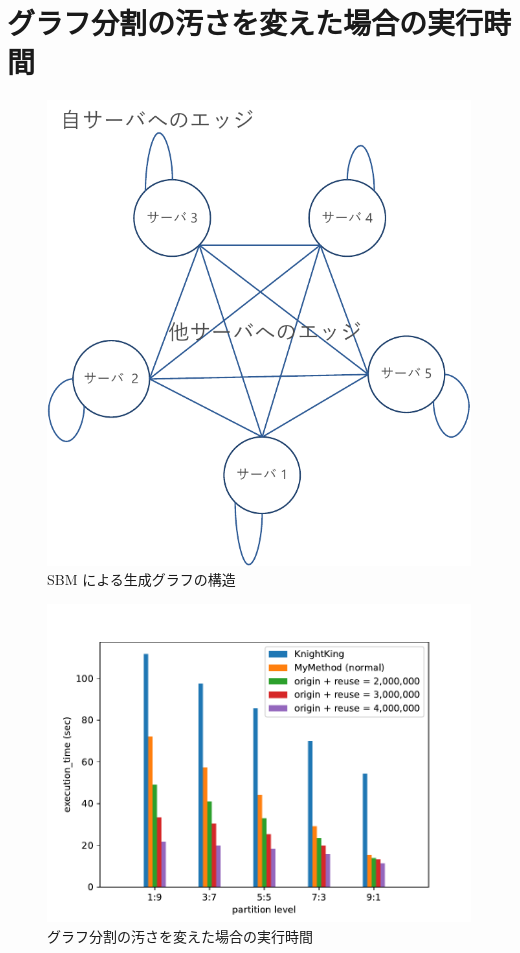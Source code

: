 \section{グラフ分割の汚さを変えた場合の実行時間}\label{グラフ分割の汚さを変えた場合の実行時間}

\begin{figure}[t]
    \centering
    \includegraphics[scale=0.7]{figure/sbm.pdf}
    \caption{SBM による生成グラフの構造}
    \label{SBM による生成グラフの構造}
\end{figure}

\begin{figure}[t!]
    \centering
    \includegraphics[scale=0.9]{figure/Kn_vs_AR_partition_level.pdf}
    \caption{グラフ分割の汚さを変えた場合の実行時間}
    \label{グラフ分割の汚さを変えた場合の実行時間の結果}
\end{figure}

